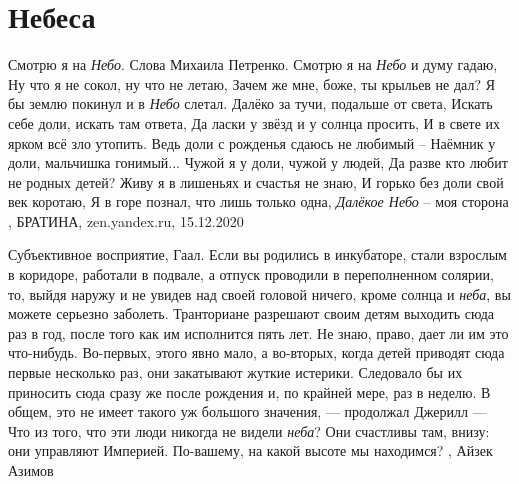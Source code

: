  
 
 
 
 
\chapter{Небеса}
\label{sec:slova.nebesa}

Смотрю я на \emph{Небо}. Слова Михаила Петренко. Смотрю я на \emph{Небо} и думу
гадаю, Ну что я не сокол, ну что не летаю, Зачем же мне, боже, ты крыльев не
дал? Я бы землю покинул и в \emph{Небо} слетал. Далёко за тучи, подальше от
света, Искать себе доли, искать там ответа, Да ласки у звёзд и у солнца
просить, И в свете их ярком всё зло утопить. Ведь доли с рожденья сдаюсь не
любимый – Наёмник у доли, мальчишка гонимый... Чужой я у доли, чужой у людей,
Да разве кто любит не родных детей? Живу я в лишеньях и счастья не знаю, И
горько без доли свой век коротаю, Я в горе познал, что лишь только одна,
\emph{Далёкое Небо} – моя сторона
, 
БРАТИНА, zen.yandex.ru, 15.12.2020

Субъективное восприятие, Гаал. Если вы родились в инкубаторе, стали взрослым в
коридоре, работали в подвале, а отпуск проводили в переполненном солярии, то,
выйдя наружу и не увидев над своей головой ничего, кроме солнца и \emph{неба}, вы
можете серьезно заболеть. Транториане разрешают своим детям выходить сюда раз в
год, после того как им исполнится пять лет. Не знаю, право, дает ли им это
что-нибудь. Во-первых, этого явно мало, а во-вторых, когда детей приводят сюда
первые несколько раз, они закатывают жуткие истерики. Следовало бы их приносить
сюда сразу же после рождения и, по крайней мере, раз в неделю. В общем, это не
имеет такого уж большого значения, — продолжал Джерилл — Что из того, что эти
люди никогда не видели \emph{неба}? Они счастливы там, внизу: они управляют Империей.
По-вашему, на какой высоте мы находимся?
, Айзек Азимов
